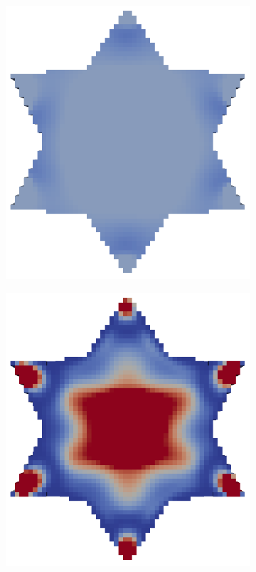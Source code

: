\begin{figure}
\centering
\begin{subfigure}[c]{.24\linewidth}
\centering
  \includegraphics[width=\linewidth]{Pictures/TopOp/Star_Optimized0_Trans.png}
\end{subfigure}%
\begin{subfigure}[c]{.24\linewidth}
\centering
  \includegraphics[width=\linewidth]{Pictures/TopOp/Star_Optimized2_Trans.png}

\end{subfigure}
\end{figure}
